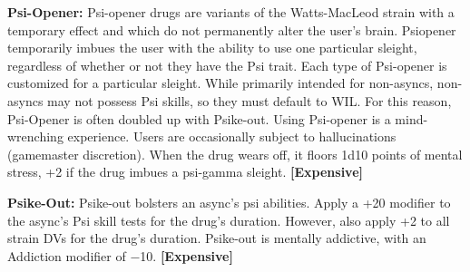 \textbf{Psi-Opener:} Psi-opener drugs are variants of the Watts-MacLeod strain with a temporary effect and which do not permanently alter the user’s brain. Psiopener temporarily imbues the user with the ability to use one particular sleight, regardless of whether or not they have the Psi trait. Each type of Psi-opener is customized for a particular sleight. While primarily intended for non-asyncs, non-asyncs may not possess Psi skills, so they must default to WIL. For this reason, Psi-Opener is often doubled up with Psike-out. Using Psi-opener is a mind-wrenching experience. Users are occasionally subject to hallucinations (gamemaster discretion). When the drug wears off, it floors 1d10 points of mental stress, +2 if the drug imbues a psi-gamma sleight. \textbf{[Expensive]} 

\textbf{Psike-Out:} Psike-out bolsters an async’s psi abilities. Apply a +20 modifier to the async’s Psi skill tests for the drug’s duration. However, also apply +2 to all strain DVs for the drug’s duration. Psike-out is mentally addictive, with an Addiction modifier of $-$10. \textbf{[Expensive]} 


